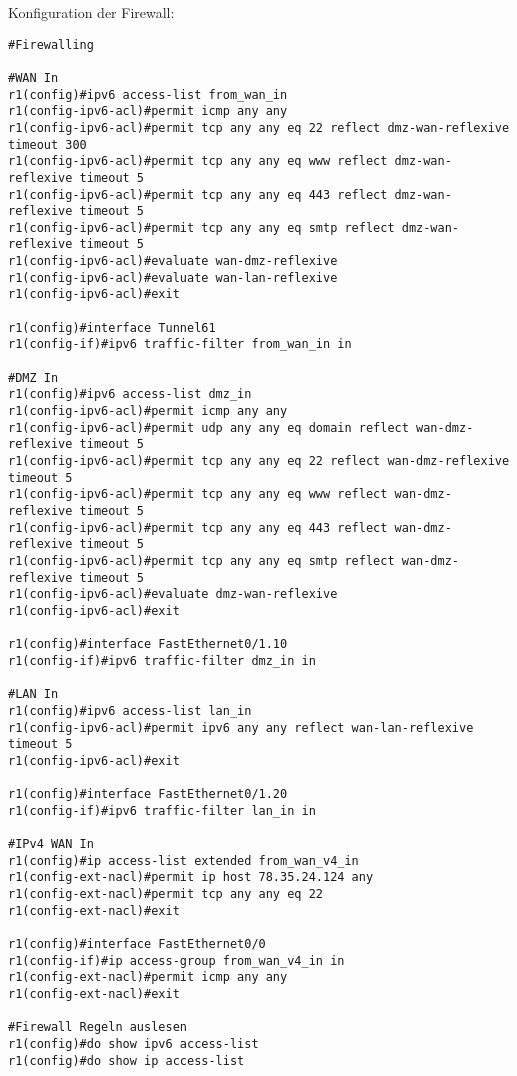 Konfiguration der Firewall:
\begin{lstlisting}[numbers=none]
#Firewalling

#WAN In
r1(config)#ipv6 access-list from_wan_in
r1(config-ipv6-acl)#permit icmp any any
r1(config-ipv6-acl)#permit tcp any any eq 22 reflect dmz-wan-reflexive timeout 300
r1(config-ipv6-acl)#permit tcp any any eq www reflect dmz-wan-reflexive timeout 5
r1(config-ipv6-acl)#permit tcp any any eq 443 reflect dmz-wan-reflexive timeout 5
r1(config-ipv6-acl)#permit tcp any any eq smtp reflect dmz-wan-reflexive timeout 5
r1(config-ipv6-acl)#evaluate wan-dmz-reflexive
r1(config-ipv6-acl)#evaluate wan-lan-reflexive
r1(config-ipv6-acl)#exit

r1(config)#interface Tunnel61
r1(config-if)#ipv6 traffic-filter from_wan_in in

#DMZ In
r1(config)#ipv6 access-list dmz_in
r1(config-ipv6-acl)#permit icmp any any
r1(config-ipv6-acl)#permit udp any any eq domain reflect wan-dmz-reflexive timeout 5
r1(config-ipv6-acl)#permit tcp any any eq 22 reflect wan-dmz-reflexive timeout 5
r1(config-ipv6-acl)#permit tcp any any eq www reflect wan-dmz-reflexive timeout 5
r1(config-ipv6-acl)#permit tcp any any eq 443 reflect wan-dmz-reflexive timeout 5
r1(config-ipv6-acl)#permit tcp any any eq smtp reflect wan-dmz-reflexive timeout 5
r1(config-ipv6-acl)#evaluate dmz-wan-reflexive
r1(config-ipv6-acl)#exit

r1(config)#interface FastEthernet0/1.10
r1(config-if)#ipv6 traffic-filter dmz_in in

#LAN In
r1(config)#ipv6 access-list lan_in
r1(config-ipv6-acl)#permit ipv6 any any reflect wan-lan-reflexive timeout 5
r1(config-ipv6-acl)#exit

r1(config)#interface FastEthernet0/1.20
r1(config-if)#ipv6 traffic-filter lan_in in

#IPv4 WAN In
r1(config)#ip access-list extended from_wan_v4_in
r1(config-ext-nacl)#permit ip host 78.35.24.124 any
r1(config-ext-nacl)#permit tcp any any eq 22
r1(config-ext-nacl)#exit

r1(config)#interface FastEthernet0/0
r1(config-if)#ip access-group from_wan_v4_in in
r1(config-ext-nacl)#permit icmp any any
r1(config-ext-nacl)#exit

#Firewall Regeln auslesen
r1(config)#do show ipv6 access-list
r1(config)#do show ip access-list
\end{lstlisting}
